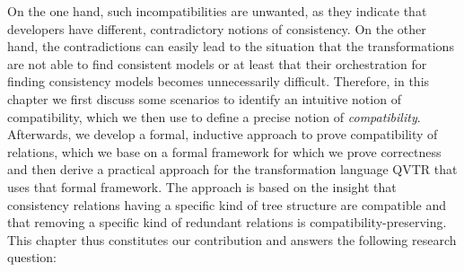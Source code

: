 On the one hand, such incompatibilities are unwanted, as they indicate that developers have different, contradictory notions of consistency.
On the other hand, the contradictions can easily lead to the situation that the transformations are not able to find consistent models or at least that their orchestration for finding consistency models becomes unnecessarily difficult.
Therefore, in this chapter we first discuss some scenarios to identify an intuitive notion of compatibility, which we then use to define a precise notion of \emph{compatibility}.
Afterwards, we develop a formal, inductive approach to prove compatibility of relations, which we base on a formal framework for which we prove correctness and then derive a practical approach for the transformation language \gls{QVTR} that uses that formal framework.
The approach is based on the insight that consistency relations having a specific kind of tree structure are compatible and that removing a specific kind of redundant relations is compatibility-preserving.
This chapter thus constitutes our contribution  and answers the following research question:


